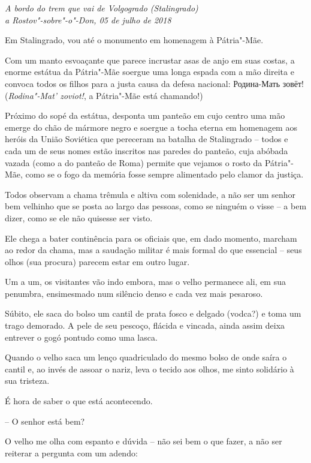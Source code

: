 \begin{flushright}
\emph{A bordo do trem que vai de Volgogrado (Stalingrado)\\a Rostov"-sobre"-o"-Don,
05 de julho de 2018}
\end{flushright}

Em Stalingrado, vou até o monumento em homenagem à Pátria"-Mãe.

Com um manto esvoaçante que parece incrustar asas de anjo em suas
costas, a enorme estátua da Pátria"-Mãe soergue uma longa espada com a
mão direita e convoca todos os filhos para a justa causa da defesa
nacional: Родина-Мать зовёт! (\emph{Rodina"-Mat' zoviot!}, a Pátria"-Mãe
está chamando!)

Próximo do sopé da estátua, desponta um panteão em cujo centro uma mão
emerge do chão de mármore negro e soergue a tocha eterna em homenagem
aos heróis da União Soviética que pereceram na batalha de Stalingrado --
todos e cada um de seus nomes estão inscritos nas paredes do panteão,
cuja abóbada vazada (como a do panteão de Roma) permite que vejamos o
rosto da Pátria"-Mãe, como se o fogo da memória fosse sempre alimentado
pelo clamor da justiça.

Todos observam a chama trêmula e altiva com solenidade, a não ser um
senhor bem velhinho que se posta ao largo das pessoas, como se ninguém o
visse -- a bem dizer, como se ele não quisesse ser visto.

Ele chega a bater continência para os oficiais que, em dado momento,
marcham ao redor da chama, mas a saudação militar é mais formal do que
essencial -- seus olhos (sua procura) parecem estar em outro lugar.

Um a um, os visitantes vão indo embora, mas o velho permanece ali, em
sua penumbra, ensimesmado num silêncio denso e cada vez mais pesaroso.

Súbito, ele saca do bolso um cantil de prata fosco e delgado (vodca?) e
toma um trago demorado. A pele de seu pescoço, flácida e vincada, ainda
assim deixa entrever o gogó pontudo como uma lasca.

Quando o velho saca um lenço quadriculado do mesmo bolso de onde saíra o
cantil e, ao invés de assoar o nariz, leva o tecido aos olhos, me sinto
solidário à sua tristeza.

É hora de saber o que está acontecendo.

-- O senhor está bem?

O velho me olha com espanto e dúvida -- não sei bem o que fazer, a não
ser reiterar a pergunta com um adendo:

